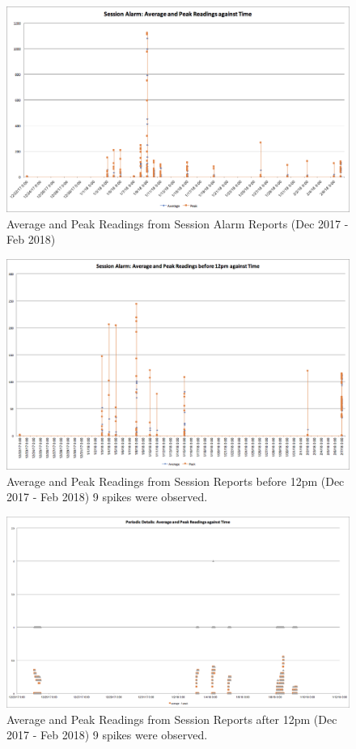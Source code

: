 \documentclass[twoside,twocolumn]{article}
\begin{document}
\begin{figure}
\includegraphics[width=15.1cm]{images/image1.png}
\caption{Average and Peak Readings from Session Alarm Reports (Dec 2017 - Feb 2018)}
\end{figure}
\begin{figure}
\includegraphics[width=15.1cm]{images/image6.png}
\caption{Average and Peak Readings from Session Reports before 12pm  (Dec 2017 - Feb 2018) 9 spikes were observed.}
\end{figure}
\begin{figure}
\includegraphics[width=15.1cm]{images/image3.png}
\caption{Average and Peak Readings from Session Reports after 12pm (Dec 2017 - Feb 2018) 9 spikes were observed.}
\end{figure}
\end{document}
